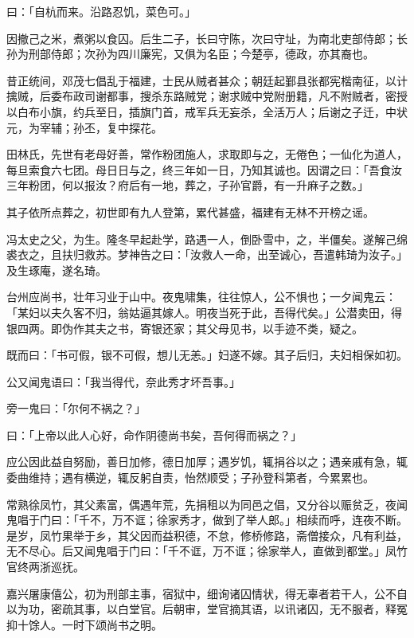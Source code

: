 \documentclass[12pt,twoside,openany]{book}
\begin{document}
曰：「自杭而来。沿路忍饥，菜色可。」

因撤己之米，煮粥以食囚。后生二子，长曰守陈，次曰守址，为南北吏部侍郎；长孙为刑部侍郎；次孙为四川廉宪，又俱为名臣；今楚亭，德政，亦其裔也。

昔正统间，邓茂七倡乱于福建，士民从贼者甚众；朝廷起鄞县张都宪楷南征，以计擒贼，后委布政司谢都事，搜杀东路贼党；谢求贼中党附册籍，凡不附贼者，密授以白布小旗，约兵至日，插旗门首，戒军兵无妄杀，全活万人；后谢之子迁，中状元，为宰辅；孙丕，复中探花。

田林氏，先世有老母好善，常作粉团施人，求取即与之，无倦色；一仙化为道人，每旦索食六七团。母日日与之，终三年如一日，乃知其诚也。因谓之曰：「吾食汝三年粉团，何以报汝？府后有一地，葬之，子孙官爵，有一升麻子之数。」

其子依所点葬之，初世即有九人登第，累代甚盛，福建有无林不开榜之谣。

冯太史之父，为生。隆冬早起赴学，路遇一人，倒卧雪中，之，半僵矣。遂解己绵裘衣之，且扶归救苏。梦神告之曰：「汝救人一命，出至诚心，吾遣韩琦为汝子。」及生琢庵，遂名琦。

台州应尚书，壮年习业于山中。夜鬼啸集，往往惊人，公不惧也；一夕闻鬼云：「某妇以夫久客不归，翁姑逼其嫁人。明夜当死于此，吾得代矣。」公潜卖田，得银四两。即伪作其夫之书，寄银还家；其父母见书，以手迹不类，疑之。

既而曰：「书可假，银不可假，想儿无恙。」妇遂不嫁。其子后归，夫妇相保如初。

公又闻鬼语曰：「我当得代，奈此秀才坏吾事。」

旁一鬼曰：「尔何不祸之？」

曰：「上帝以此人心好，命作阴德尚书矣，吾何得而祸之？」

应公因此益自努励，善日加修，德日加厚；遇岁饥，辄捐谷以之；遇亲戚有急，辄委曲维持；遇有横逆，辄反躬自责，怡然顺受；子孙登科第者，今累累也。

常熟徐凤竹，其父素富，偶遇年荒，先捐租以为同邑之倡，又分谷以赈贫乏，夜闻鬼唱于门曰：「千不，万不诓；徐家秀才，做到了举人郎。」相续而呼，连夜不断。是岁，凤竹果举于乡，其父因而益积德，不怠，修桥修路，斋僧接众，凡有利益，无不尽心。后又闻鬼唱于门曰：「千不诓，万不诓；徐家举人，直做到都堂。」凤竹官终两浙巡抚。

嘉兴屠康僖公，初为刑部主事，宿狱中，细询诸囚情状，得无辜者若干人，公不自以为功，密疏其事，以白堂官。后朝审，堂官摘其语，以讯诸囚，无不服者，释冤抑十馀人。一时下颂尚书之明。
\end{document}
